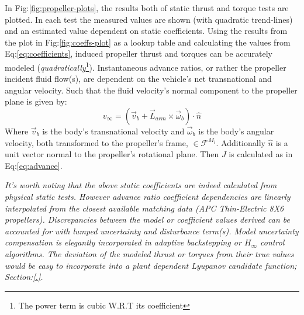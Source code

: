 \par
In Fig:\ref{fig:propeller-plots}, the results both of static thrust and torque tests are plotted. In each test the measured values are shown (with quadratic trend-lines) and an estimated value dependent on static coefficients. Using the results from the plot in Fig:\ref{fig:coeffs-plot} as a lookup table and calculating the values from Eq:\ref{eq:coefficients}, induced propeller thrust and torques can be accurately modeled (\emph{quadratically}\footnote{The power term is cubic W.R.T its coefficient}). Instantaneous advance ratios, or rather the propeller incident fluid flow(s), are dependent on the vehicle's net transnational and angular velocity. Such that the fluid velocity's normal component to the propeller plane is given by:
\begin{equation}
v_\infty = (\vec{v}_b + \vec{L}_{arm}\times \vec{\omega}_b)\cdot \hat{n}
\end{equation}
Where $\vec{v}_b$ is the body's transnational velocity and $\vec{\omega}_b$ is the body's angular velocity, both transformed to the propeller's frame, $\in\mathcal{F}^{M_i}$. Additionally $\hat{n}$ is a unit vector normal to the propeller's rotational plane. Then $J$ is calculated as in Eq:\ref{eq:advance}.
\par
{\color{Gray}\emph{It's worth noting that the above static coefficients are indeed calculated from physical static tests. However advance ratio coefficient dependencies are linearly interpolated from the closest available matching data (APC Thin-Electric 8X6 propellers). Discrepancies between the model or coefficient values derived can be accounted for with lumped uncertainty and disturbance term(s). Model uncertainty compensation is elegantly incorporated in adaptive backstepping or $H_\infty$ control algorithms. The deviation of the modeled thrust or torques from their true values would be easy to incorporate into a plant dependent Lyupanov candidate function; Section:\ref{.}.}}
